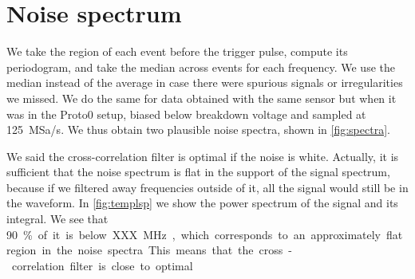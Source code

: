 \section{Noise spectrum}
\label{sec:spectrum}

We take the region of each event before the trigger pulse, compute its
periodogram, and take the median across events for each frequency. We use the
median instead of the average in case there were spurious signals or
irregularities we missed. We do the same for data obtained with the same sensor
but when it was in the Proto0 setup, biased below breakdown voltage and sampled
at \SI{125}{MSa/s}. We thus obtain two plausible noise spectra, shown in
\autoref{fig:spectra}.


\begin{figure}
    

\end{figure}

We said the cross-correlation filter is optimal if the noise is white.
Actually, it is sufficient that the noise spectrum is flat in the support of
the signal spectrum, because if we filtered away frequencies outside of it, all
the signal would still be in the waveform. In \autoref{fig:templsp} we show
the power spectrum of the signal and its integral. We see that \SI{90}\% of it
is below XXX~\si{MHz}, which corresponds to an approximately flat region in the
noise spectra. This means that the cross-correlation filter is close to
optimal. 

\begin{figure}
    

\end{figure}
